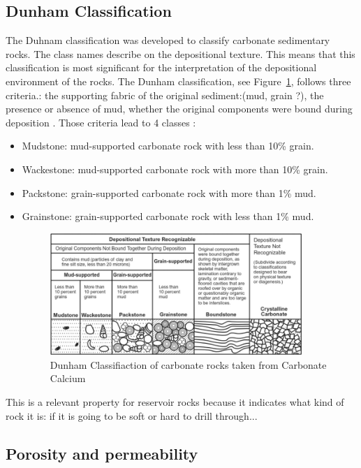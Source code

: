 \subsection{Dunham Classification}
The Duhnam classification was developed to classify carbonate sedimentary rocks. The class names describe on the depositional texture. This means that this classification is most significant for the interpretation of the depositional environment of the rocks. The Dunham classification, see Figure~\ref{fig:dunham}, follows three criteria.: the supporting fabric of the original sediment:(mud, grain ?), the presence or absence of mud, whether the original components were bound during deposition \cite{dunhamrevised}.
Those criteria lead to 4 classes :
\begin{itemize}
    \item Mudstone: mud-supported carbonate rock with less than 10\% grain.
    \item Wackestone: mud-supported carbonate rock with more than 10\% grain.
    \item Packstone: grain-supported carbonate rock with more than 1\% mud.
    \item Grainstone: grain-supported carbonate rock with less than 1\% mud.
	\begin{figure}[!htp]
    \centering
        \includegraphics[width=0.9\textwidth]{figures/02-Dunhams-classification}
        \caption[Dunham Classifcation]{Dunham Classifiaction of carbonate rocks taken from Carbonate Calcium \cite{dunhamfig}}\label{fig:dunham}
    \end{figure}
\end{itemize}
This is a relevant property for reservoir rocks because it indicates what kind of rock it is: if it is going to be soft or hard to drill through...

\subsection{Porosity and permeability}

